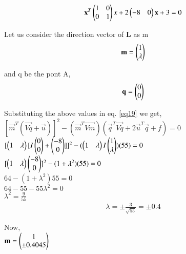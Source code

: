 \documentclass[journal,12pt,twocolumn]{IEEEtran}
\begin{document}
\centering
\begin{align}
\mathbf{x}^T \begin{pmatrix}1&0\\0&1\end{pmatrix} x + 2 \begin{pmatrix}-8&0\end{pmatrix} \mathbf{x} + 3 = 0 
\label{eq20}
\end{align}
\vspace{0.25cm}
\raggedright{Let us consider the direction vector of \textbf{L} as m}\\
\vspace{0.25cm}
\begin{align}
\mathbf{m}=\begin{pmatrix}1 \\ \lambda\end{pmatrix}     
\label{eq21}
\end{align}
\raggedright{and q be the pont A,}\\
\begin{align}
\mathbf{q}=\begin{pmatrix}0 \\ 0\end{pmatrix} 
\label{eq22}
\end{align}
\raggedright{Substituting the above values in eq. \eqref{eq19} we get,}\\
\vspace{0.25cm}
\centering
$ [ \vec{m}^T (\vec{Vq} + \vec{u}) ]^2 -(\vec{m}^T \vec{Vm})(\vec{q}^T \vec{Vq} + 2\vec{u}^T \vec{q} + f) = 0$ \\
\vspace{0.25cm}
$ [ \begin{pmatrix}1 & \lambda\end{pmatrix} [I \begin{pmatrix}0\\0\end{pmatrix} + \begin{pmatrix}-8 \\ 0\end{pmatrix}]]^2 - ( \begin{pmatrix}1&\lambda\end{pmatrix} I \begin{pmatrix}1\\ \lambda\end{pmatrix}) (55) = 0 $ \\
\vspace{0.25cm}
$ [ \begin{pmatrix}1 & \lambda\end{pmatrix} \begin{pmatrix}-8 \\ 0\end{pmatrix}]^2 - (1 + \lambda^2) (55) = 0 $ \\
\vspace{0.25cm}
$ 64 - ( 1 + \lambda^2 ) 55 = 0 $\\
\vspace{0.25cm}
$ 64 - 55 - 55\lambda^2 = 0 $ \\
\vspace{0.25cm}
$ \lambda^2 = \frac{9}{55}$ \\
\vspace{0.25cm}
\begin{align}
\lambda = \pm \frac{3}{\sqrt{55}} = \pm 0.4
\label{eq23}
\end{align}
\vspace{0.25cm}
\raggedright
Now,\\
\vspace{0.1cm}
\centering
$ \mathbf{m} = \begin{pmatrix}1 \\ \pm0.4045\end{pmatrix} $ \\
\end{document}
